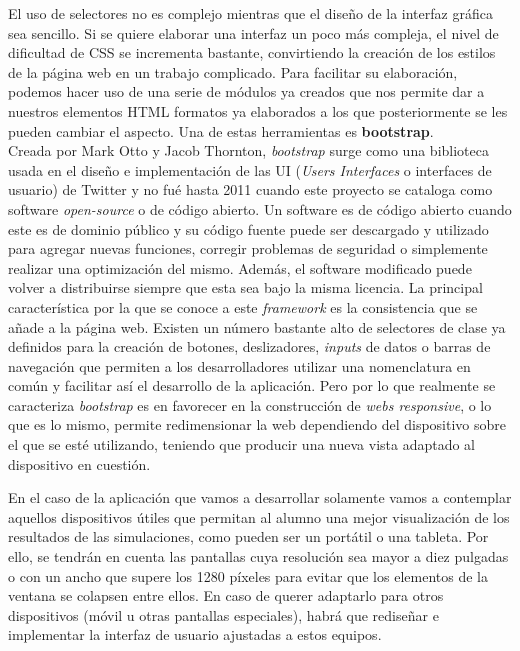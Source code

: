 \documentclass[../main.tex]{subfiles}
\begin{document}
    El uso de selectores no es complejo mientras que el diseño de la interfaz gráfica sea sencillo. Si se quiere elaborar una interfaz un poco más compleja, el nivel de dificultad de CSS se incrementa bastante, convirtiendo la creación de los estilos de la página web en un trabajo complicado. Para facilitar su elaboración, podemos hacer uso de una serie de módulos ya creados que nos permite dar a nuestros elementos HTML formatos ya elaborados a los  que posteriormente se les pueden cambiar el aspecto. Una de estas herramientas es \textbf{bootstrap}.\\
     
    Creada por Mark Otto y Jacob Thornton, \textit{bootstrap} surge como una biblioteca usada en el diseño e implementación de las UI (\textit{Users Interfaces} o interfaces de usuario) de Twitter y no fué hasta 2011 cuando este proyecto se cataloga como software \textit{open-source} o de código abierto. Un software es de código abierto cuando este es de dominio público y su código fuente puede ser descargado y utilizado para agregar nuevas funciones, corregir problemas de seguridad o simplemente realizar una optimización del mismo. Además, el software modificado puede volver a distribuirse siempre que esta sea bajo la misma licencia. La principal característica por la que se conoce a este \textit{framework} es la consistencia que se añade a la página web. Existen un número bastante alto de selectores de clase ya definidos para la creación de botones, deslizadores, \textit{inputs} de datos o barras de navegación que permiten a los desarrolladores utilizar una nomenclatura en común y facilitar así el desarrollo de la aplicación. Pero por lo que realmente se caracteriza \textit{bootstrap} es en favorecer en la construcción de \textit{webs responsive}, o lo que es lo mismo, permite redimensionar la web dependiendo del dispositivo sobre el que se esté utilizando, teniendo que producir una nueva vista adaptado al dispositivo en cuestión.\newline
    
    
    En el caso de la aplicación que vamos a desarrollar solamente vamos a contemplar aquellos dispositivos útiles que permitan al alumno una mejor visualización de los resultados de las simulaciones, como pueden ser un portátil o una tableta. Por ello, se tendrán en cuenta las pantallas cuya resolución sea mayor a diez pulgadas o con un ancho que supere los 1280 píxeles para evitar que los elementos de la ventana se colapsen entre ellos. En caso de querer adaptarlo para otros dispositivos (móvil u otras pantallas especiales), habrá que rediseñar e implementar la interfaz de usuario ajustadas a estos equipos.
    
\end{document}
